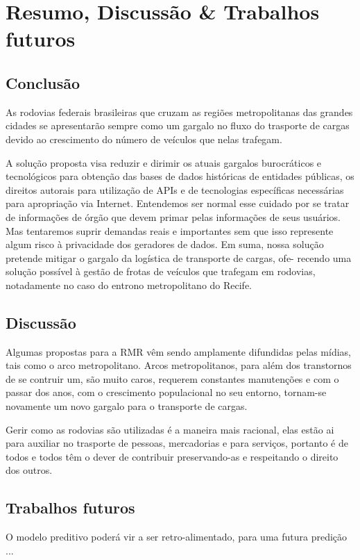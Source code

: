 \chapter{Resumo, Discussão \& Trabalhos futuros}\label{conclusao}

\section{ Conclusão}\label{intro:resumen}

As rodovias federais brasileiras que cruzam as regiões metropolitanas das grandes cidades se apresentarão sempre como um gargalo no 
fluxo do trasporte de cargas devido ao crescimento do número de veículos que nelas trafegam.

A solução proposta visa reduzir e dirimir os atuais gargalos burocráticos e tecnológicos
para obtenção das bases de dados históricas de entidades públicas, os direitos autorais 
para utilização de APIs e de tecnologias específicas necessárias para apropriação via Internet. 
Entendemos ser normal esse cuidado por se tratar de informações de órgão que devem primar 
pelas informações de seus usuários. Mas tentaremos suprir demandas reais e importantes 
sem que isso represente algum risco à privacidade dos geradores de dados. 
Em suma, nossa solução pretende mitigar o gargalo da logística de transporte de cargas, ofe-
recendo uma solução possível à gestão de frotas de veículos que trafegam em rodovias, 
notadamente no caso do entrono metropolitano do Recife.


\section{ Discussão}

Algumas propostas para a RMR vêm sendo amplamente difundidas pelas mídias, tais como o arco metropolitano. Arcos metropolitanos, 
para além dos transtornos de se contruir um, são muito caros, requerem constantes manutenções  e com o passar dos anos, 
com o crescimento populacional no seu entorno, tornam-se novamente  um novo gargalo para o transporte de cargas.

Gerir como as rodovias são utilizadas é a maneira mais racional, elas estão ai para auxiliar no trasporte de pessoas, mercadorias e para serviços, portanto é de todos e todos têm o dever de contribuir preservando-as e respeitando o direito dos outros.


\section{ Trabalhos futuros}

O modelo preditivo poderá vir a ser retro-alimentado, para uma futura predição ...